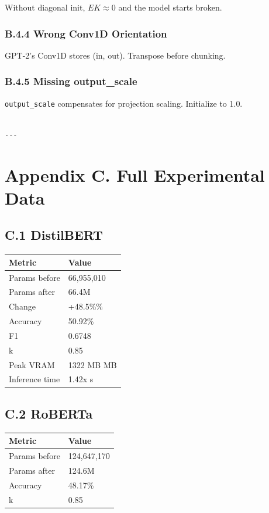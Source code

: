 Without diagonal init, $E K \approx 0$ and the model starts broken.

\subsubsection{B.4.4 Wrong Conv1D Orientation}

GPT-2's Conv1D stores (in, out). Transpose before chunking.

\subsubsection{B.4.5 Missing output\_scale}

\texttt{output\_scale} compensates for projection scaling. Initialize to 1.0.
\begin{lstlisting}

---
\end{lstlisting}

\section{Appendix C. Full Experimental Data}

\subsection{C.1 DistilBERT}

\begin{table}[H]
\centering
\small
\begin{tabular}{ll}
\toprule
\textbf{Metric} & \textbf{Value} \\
\midrule
Params before & 66,955,010 \\
Params after & 66.4M \\
Change & +48.5\%\% \\
Accuracy & 50.92\% \\
F1 & 0.6748 \\
k & 0.85 \\
Peak VRAM & 1322 MB MB \\
Inference time & 1.42x s \\
\bottomrule
\end{tabular}
\end{table}

\subsection{C.2 RoBERTa}

\begin{table}[H]
\centering
\small
\begin{tabular}{ll}
\toprule
\textbf{Metric} & \textbf{Value} \\
\midrule
Params before & 124,647,170 \\
Params after & 124.6M \\
Accuracy & 48.17\% \\
k & 0.85 \\
\bottomrule
\end{tabular}
\end{table}


